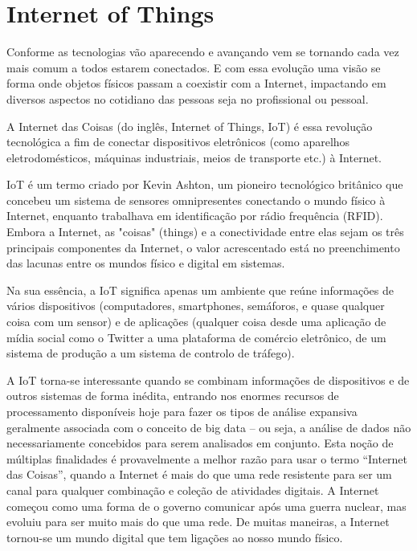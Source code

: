 \section{Internet of Things}
\label{sec:iot}

Conforme as tecnologias vão aparecendo e avançando vem se tornando cada vez mais comum a todos estarem conectados. E com essa evolução uma visão se forma onde objetos físicos passam a coexistir com a Internet, impactando em diversos aspectos no cotidiano das pessoas seja no profissional ou pessoal.

A Internet das Coisas (do inglês, Internet of Things, IoT) é essa revolução tecnológica a fim de conectar dispositivos eletrônicos (como aparelhos eletrodomésticos, máquinas industriais, meios de transporte etc.) à Internet.

IoT é um termo criado por Kevin Ashton, um pioneiro tecnológico britânico que concebeu um sistema de sensores omnipresentes conectando o mundo físico à Internet, enquanto trabalhava em identificação por rádio frequência (RFID). Embora a Internet, as "coisas" (things) e a conectividade entre elas sejam os três principais componentes da Internet, o valor acrescentado está no preenchimento das lacunas entre os mundos físico e digital em sistemas.

Na sua essência, a IoT significa apenas um ambiente que reúne informações de vários dispositivos (computadores, smartphones, semáforos, e quase qualquer coisa com um sensor) e de aplicações (qualquer coisa desde uma aplicação de mídia social como o Twitter a uma plataforma de comércio eletrônico, de um sistema de produção a um sistema de controlo de tráfego).

A IoT torna-se interessante quando se combinam informações de dispositivos e de outros sistemas de forma inédita, entrando nos enormes recursos de processamento disponíveis hoje para fazer os tipos de análise expansiva geralmente associada com o conceito de big data – ou seja, a análise de dados não necessariamente concebidos para serem analisados em conjunto. Esta noção de múltiplas finalidades é provavelmente a melhor razão para usar o termo “Internet das Coisas”, quando a Internet é mais do que uma rede resistente para ser um canal para qualquer combinação e coleção de atividades digitais. A Internet começou como uma forma de o governo comunicar após uma guerra nuclear, mas evoluiu para ser muito mais do que uma rede. De muitas maneiras, a Internet tornou-se um mundo digital que tem ligações ao nosso mundo físico.

